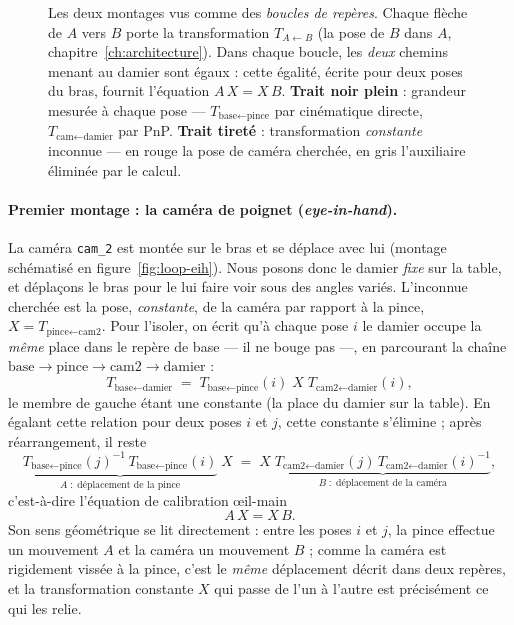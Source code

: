 \begin{figure}[t]
  \caption{Les deux montages vus comme des \emph{boucles de repères}. Chaque flèche de $A$ vers $B$ porte la transformation $T_{A\leftarrow B}$ (la pose de $B$ dans $A$, chapitre~\ref{ch:architecture}). Dans chaque boucle, les \emph{deux} chemins menant au damier sont égaux : cette égalité, écrite pour deux poses du bras, fournit l'équation $A\,X = X\,B$. \textbf{Trait noir plein} : grandeur mesurée à chaque pose --- $T_{\text{base}\leftarrow\text{pince}}$ par cinématique directe, $T_{\text{cam}\leftarrow\text{damier}}$ par PnP. \textbf{Trait tireté} : transformation \emph{constante} inconnue --- en rouge la pose de caméra cherchée, en gris l'auxiliaire éliminée par le calcul.}
  \label{fig:handeye-loops}
\end{figure}

\paragraph{Premier montage : la caméra de poignet (\emph{eye-in-hand}).} La caméra \texttt{cam\_2} est montée sur le bras et se déplace avec lui (montage schématisé en figure~\ref{fig:loop-eih}). Nous posons donc le damier \emph{fixe} sur la table, et déplaçons le bras pour le lui faire voir sous des angles variés. L'inconnue cherchée est la pose, \emph{constante}, de la caméra par rapport à la pince, $X = T_{\text{pince}\leftarrow\text{cam2}}$. Pour l'isoler, on écrit qu'à chaque pose $i$ le damier occupe la \emph{même} place dans le repère de base --- il ne bouge pas ---, en parcourant la chaîne $\text{base}\to\text{pince}\to\text{cam2}\to\text{damier}$ :
\[
  T_{\text{base}\leftarrow\text{damier}} \;=\; T_{\text{base}\leftarrow\text{pince}}(i)\; X\; T_{\text{cam2}\leftarrow\text{damier}}(i) ,
\]
le membre de gauche étant une constante (la place du damier sur la table). En égalant cette relation pour deux poses $i$ et $j$, cette constante s'élimine ; après réarrangement, il reste
\[
  \underbrace{T_{\text{base}\leftarrow\text{pince}}(j)^{-1}\,T_{\text{base}\leftarrow\text{pince}}(i)}_{A\;:\;\text{déplacement de la pince}}\; X
  \;=\; X\;
  \underbrace{T_{\text{cam2}\leftarrow\text{damier}}(j)\,T_{\text{cam2}\leftarrow\text{damier}}(i)^{-1}}_{B\;:\;\text{déplacement de la caméra}} ,
\]
c'est-à-dire l'équation de calibration œil-main
\[
  A\,X = X\,B .
\]
Son sens géométrique se lit directement : entre les poses $i$ et $j$, la pince effectue un mouvement $A$ et la caméra un mouvement $B$ ; comme la caméra est rigidement vissée à la pince, c'est le \emph{même} déplacement décrit dans deux repères, et la transformation constante $X$ qui passe de l'un à l'autre est précisément ce qui les relie.

